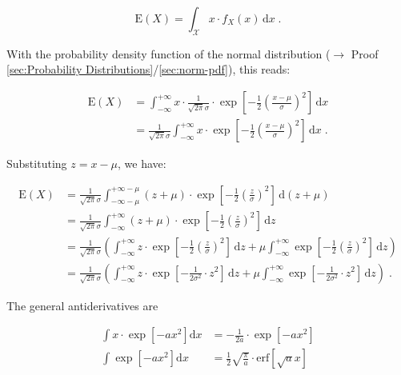 \documentclass[a4paper,12pt,twoside]{book}
\begin{document}
\begin{equation} \label{eq:norm-mean-mean}
\mathrm{E}(X) = \int_{\mathcal{X}} x \cdot f_X(x) \, \mathrm{d}x \; .
\end{equation}

With the probability density function of the normal distribution ($\rightarrow$ Proof \ref{sec:Probability Distributions}/\ref{sec:norm-pdf}), this reads:

\begin{equation} \label{eq:norm-mean-norm-mean-s1}
\begin{split}
\mathrm{E}(X) &= \int_{-\infty}^{+\infty} x \cdot \frac{1}{\sqrt{2 \pi} \sigma} \cdot \exp \left[ -\frac{1}{2} \left( \frac{x-\mu}{\sigma} \right)^2 \right] \, \mathrm{d}x \\
&= \frac{1}{\sqrt{2 \pi} \sigma} \int_{-\infty}^{+\infty} x \cdot \exp \left[ -\frac{1}{2} \left( \frac{x-\mu}{\sigma} \right)^2 \right] \, \mathrm{d}x \; .
\end{split}
\end{equation}

Substituting $z = x -\mu$, we have:

\begin{equation} \label{eq:norm-mean-norm-mean-s2}
\begin{split}
\mathrm{E}(X) &= \frac{1}{\sqrt{2 \pi} \sigma} \int_{-\infty-\mu}^{+\infty-\mu} (z + \mu) \cdot \exp \left[ -\frac{1}{2} \left( \frac{z}{\sigma} \right)^2 \right] \, \mathrm{d}(z + \mu) \\
&= \frac{1}{\sqrt{2 \pi} \sigma} \int_{-\infty}^{+\infty} (z + \mu) \cdot \exp \left[ -\frac{1}{2} \left( \frac{z}{\sigma} \right)^2 \right] \, \mathrm{d}z \\
&= \frac{1}{\sqrt{2 \pi} \sigma} \left( \int_{-\infty}^{+\infty} z \cdot \exp \left[ -\frac{1}{2} \left( \frac{z}{\sigma} \right)^2 \right] \, \mathrm{d}z + \mu \int_{-\infty}^{+\infty} \exp \left[ -\frac{1}{2} \left( \frac{z}{\sigma} \right)^2 \right] \, \mathrm{d}z \right) \\
&= \frac{1}{\sqrt{2 \pi} \sigma} \left( \int_{-\infty}^{+\infty} z \cdot \exp \left[ -\frac{1}{2 \sigma^2} \cdot z^2 \right] \, \mathrm{d}z + \mu \int_{-\infty}^{+\infty} \exp \left[ -\frac{1}{2 \sigma^2} \cdot z^2 \right] \, \mathrm{d}z \right) \; .
\end{split}
\end{equation}

The general antiderivatives are

\begin{equation} \label{eq:norm-mean-exp-erf-anti-der}
\begin{split}
\int x \cdot \exp \left[ -a x^2 \right] \mathrm{d}x &= -\frac{1}{2a} \cdot \exp \left[ -a x^2 \right] \\
\int \exp \left[ -a x^2 \right] \mathrm{d}x &= \frac{1}{2} \sqrt{\frac{\pi}{a}} \cdot \mathrm{erf} \left[ \sqrt{a} x \right]
\end{split}
\end{equation}
\end{document}
